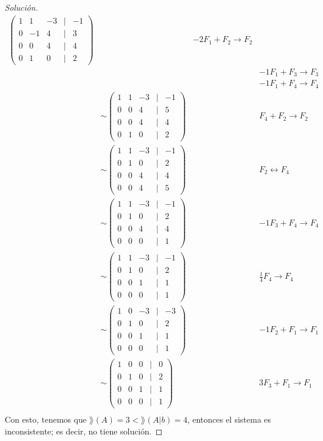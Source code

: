 \documentclass[a4,11pt]{aleph-notas}
\begin{document}
\begin{proof}[Solución]
\begin{align*}
\begin{pmatrix}
            1&1&-3&|&-1\\
            0&-1&4&|&3\\
            0&0&4&|&4\\
            0&1&0&|&2
        \end{pmatrix}
        && -2F_1+F_2\to F_2\\
        &&&-1F_1+F_3\to F_3\\
        &&&-1F_1+F_4\to F_4\\
        & \sim 
        \begin{pmatrix}
            1&1&-3&|&-1\\
            0&0&4&|&5\\
            0&0&4&|&4\\
            0&1&0&|&2
        \end{pmatrix}
        && F_4+F_2\to F_2\\
        & \sim 
        \begin{pmatrix}
            1&1&-3&|&-1\\
            0&1&0&|&2\\
            0&0&4&|&4\\
            0&0&4&|&5
        \end{pmatrix}
        && F_2 \leftrightarrow F_4\\
        & \sim 
        \begin{pmatrix}
            1&1&-3&|&-1\\
            0&1&0&|&2\\
            0&0&4&|&4\\
            0&0&0&|&1
        \end{pmatrix}
        && -1F_3+F_4\to F_4\\
        & \sim 
        \begin{pmatrix}
            1&1&-3&|&-1\\
            0&1&0&|&2\\
            0&0&1&|&1\\
            0&0&0&|&1
        \end{pmatrix}
        && \frac{1}{4}F_4\to F_4\\
         & \sim 
        \begin{pmatrix}
            1&0&-3&|&-3\\
            0&1&0&|&2\\
            0&0&1&|&1\\
            0&0&0&|&1
        \end{pmatrix}
        && -1F_2+F_1\to F_1\\
        & \sim 
        \begin{pmatrix}
            1&0&0&|&0\\
            0&1&0&|&2\\
            0&0&1&|&1\\
            0&0&0&|&1
        \end{pmatrix}
        && 3F_3+F_1\to F_1\\
    \end{align*}
    Con esto, tenemos que $\rang(A)=3 < \rang(A|b) = 4$, entonces el sistema es inconsistente; es decir, no tiene solución.
\end{proof}
\end{document}
